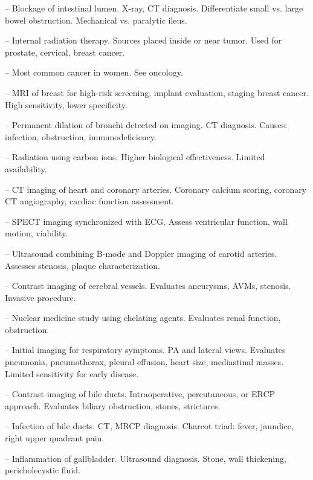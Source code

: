 -- Blockage of intestinal lumen. X-ray, CT diagnosis. Differentiate small vs. large bowel obstruction. Mechanical vs. paralytic ileus.

-- Internal radiation therapy. Sources placed inside or near tumor. Used for prostate, cervical, breast cancer.

-- Most common cancer in women. See oncology.

-- MRI of breast for high-risk screening, implant evaluation, staging breast cancer. High sensitivity, lower specificity.

-- Permanent dilation of bronchi detected on imaging. CT diagnosis. Causes: infection, obstruction, immunodeficiency.

-- Radiation using carbon ions. Higher biological effectiveness. Limited availability.

-- CT imaging of heart and coronary arteries. Coronary calcium scoring, coronary CT angiography, cardiac function assessment.

-- SPECT imaging synchronized with ECG. Assess ventricular function, wall motion, viability.

-- Ultrasound combining B-mode and Doppler imaging of carotid arteries. Assesses stenosis, plaque characterization.

-- Contrast imaging of cerebral vessels. Evaluates aneurysms, AVMs, stenosis. Invasive procedure.

-- Nuclear medicine study using chelating agents. Evaluates renal function, obstruction.

-- Initial imaging for respiratory symptoms. PA and lateral views. Evaluates pneumonia, pneumothorax, pleural effusion, heart size, mediastinal masses. Limited sensitivity for early disease.

-- Contrast imaging of bile ducts. Intraoperative, percutaneous, or ERCP approach. Evaluates biliary obstruction, stones, strictures.

-- Infection of bile ducts. CT, MRCP diagnosis. Charcot triad: fever, jaundice, right upper quadrant pain.

-- Inflammation of gallbladder. Ultrasound diagnosis. Stone, wall thickening, pericholecystic fluid.

